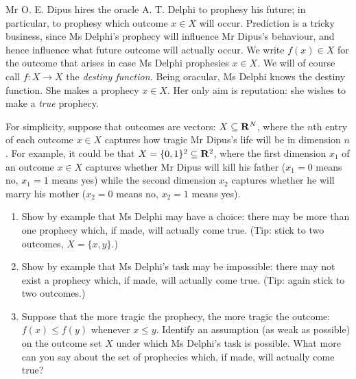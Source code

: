 \begin{exercise}[easy]
	\label{exercise:oedipus}
	Mr O. E. Dipus hires the oracle A. T. Delphi to prophesy his future; in particular, to prophesy which outcome $x \in X$ will occur. Prediction is a tricky business, since Ms Delphi's prophecy will influence Mr Dipus's behaviour, and hence influence what future outcome will actually occur. We write $f(x) \in X$ for the outcome that arises in case Ms Delphi prophesies $x \in X$. We will of course call $f : X \to X$ the \emph{destiny function.} Being oracular, Ms Delphi knows the destiny function. She makes a prophecy $x \in X$. Her only aim is reputation: she wishes to make a \emph{true} prophecy.

	For simplicity, suppose that outcomes are vectors: $X \subseteq \mathbf{R}^N$, where the $n$th entry of each outcome $x \in X$ captures how tragic Mr Dipus's life will be in dimension $n$. For example, it could be that $X = \{0,1\}^2 \subseteq \mathbf{R}^2$, where the first dimension $x_1$ of an outcome $x \in X$ captures whether Mr Dipus will kill his father ($x_1=0$ means no, $x_1=1$ means yes) while the second dimension $x_2$ captures whether he will marry his mother ($x_2=0$ means no, $x_2=1$ means yes).

	\begin{enumerate}[label=(\alph*)]
	
		\item Show by example that Ms Delphi may have a choice: there may be more than one prophecy which, if made, will actually come true. (Tip: stick to two outcomes, $X=\{x,y\}$.)

		\item Show by example that Ms Delphi's task may be impossible: there may not exist a prophecy which, if made, will actually come true. (Tip: again stick to two outcomes.)

		\item Suppose that the more tragic the prophecy, the more tragic the outcome: $f(x) \leq f(y)$ whenever $x \leq y$. Identify an assumption (as weak as possible) on the outcome set $X$ under which Ms Delphi's task is possible. What more can you say about the set of prophecies which, if made, will actually come true?

	
	\end{enumerate}
\end{exercise}
